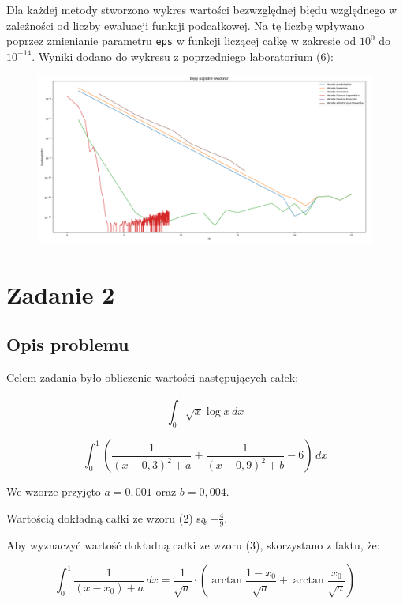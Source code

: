\documentclass{article}
\begin{document}
	Dla każdej metody stworzono wykres wartości bezwzględnej błędu względnego w zależności od liczby ewaluacji funkcji podcałkowej. Na tę liczbę wpływano poprzez zmienianie parametru \texttt{eps} w funkcji liczącej całkę w zakresie od $10^{0}$ do $10^{-14}$. Wyniki dodano do wykresu z poprzedniego laboratorium (6):

	\begin{figure}[h]
		\centering
		\includegraphics[scale = 0.3]{wykres1.png}
	\end{figure}

	\newpage

	\section*{Zadanie 2}

	\subsection*{Opis problemu}

	Celem zadania było obliczenie wartości następujących całek:

	\begin{equation}
		\int_{0}^{1} \sqrt{x} \log x \,dx
	\end{equation}

	\begin{equation}
		\int_{0}^{1} \left(\frac{1}{(x-0,3)^2+a} + \frac{1}{(x-0,9)^2+b} - 6\right) \,dx
	\end{equation}

	We wzorze przyjęto $a = 0,001$ oraz $b = 0,004$. 

	Wartością dokładną całki ze wzoru (2) są $-\frac{4}{9}$.
	
	Aby wyznaczyć wartość dokładną całki ze wzoru (3), skorzystano z faktu, że:

	\begin{equation}
		\int_{0}^{1} \frac{1}{(x-x_0) + a} \,dx = \frac{1}{\sqrt{a}} \cdot \left(\arctan \frac{1-x_0}{\sqrt{a}} +\arctan \frac{x_0}{\sqrt{a}}\right)
	\end{equation}
\end{document}
